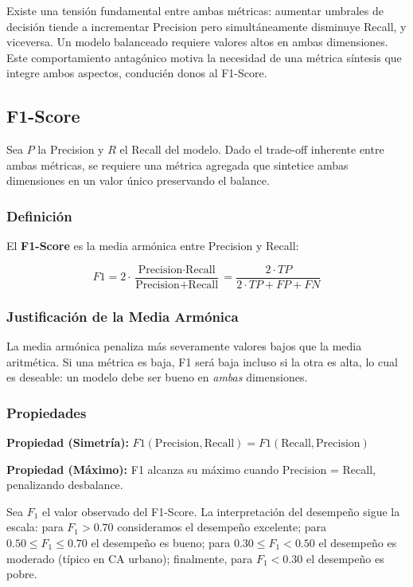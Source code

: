 Existe una tensión fundamental entre ambas métricas: aumentar umbrales de decisión tiende a incrementar Precision pero simultáneamente disminuye Recall, y viceversa. Un modelo balanceado requiere valores altos en ambas dimensiones. Este comportamiento antagónico motiva la necesidad de una métrica síntesis que integre ambos aspectos, conducién donos al F1-Score.

\subsection{F1-Score}

Sea $P$ la Precision y $R$ el Recall del modelo. Dado el trade-off inherente entre ambas métricas, se requiere una métrica agregada que sintetice ambas dimensiones en un valor único preservando el balance.

\subsubsection{Definición}

El \textbf{F1-Score} es la media armónica entre Precision y Recall:

\begin{equation}
F1 = 2 \cdot \frac{\text{Precision} \cdot \text{Recall}}{\text{Precision} + \text{Recall}} = \frac{2 \cdot TP}{2 \cdot TP + FP + FN}
\label{eq:f1}
\end{equation}

\subsubsection{Justificación de la Media Armónica}

La media armónica penaliza más severamente valores bajos que la media aritmética. Si una métrica es baja, F1 será baja incluso si la otra es alta, lo cual es deseable: un modelo debe ser bueno en \textit{ambas} dimensiones.

\subsubsection{Propiedades}

\textbf{Propiedad (Simetría):} $F1(\text{Precision}, \text{Recall}) = F1(\text{Recall}, \text{Precision})$

\textbf{Propiedad (Máximo):} F1 alcanza su máximo cuando Precision = Recall, penalizando desbalance.

Sea $F_1$ el valor observado del F1-Score. La interpretación del desempeño sigue la escala: para $F_1 > 0.70$ consideramos el desempeño excelente; para $0.50 \leq F_1 \leq 0.70$ el desempeño es bueno; para $0.30 \leq F_1 < 0.50$ el desempeño es moderado (típico en CA urbano); finalmente, para $F_1 < 0.30$ el desempeño es pobre.

